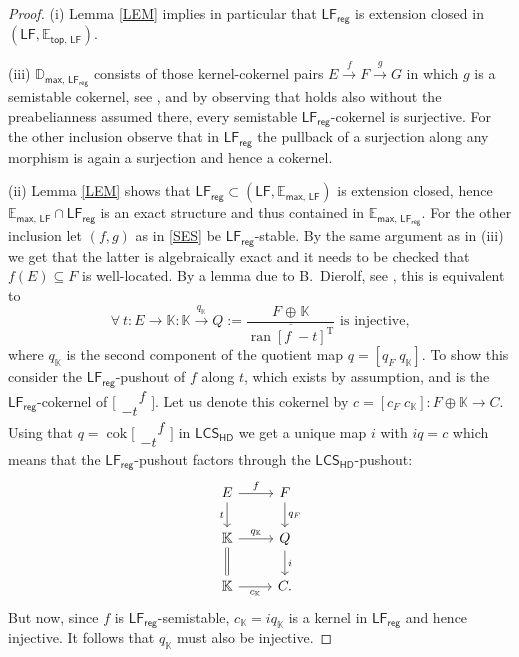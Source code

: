 \documentclass[11pt, a4paper, reqno]{amsart}
\theoremstyle{definition}
\newcommand{\ran}{\operatorname{ran}\nolimits}
\newcommand{\cok}{\operatorname{cok}\nolimits}
\newcommand{\KK}{\mathbb{K}}
\newcommand{\EE}{\mathbb{E}}
\newcommand{\DD}{\mathbb{D}}
\newcommand{\HDLCS}{\mathsf{LCS}_{\mathsf{HD}}}
\newcommand{\LF}{\mathsf{LF}}
\newcommand{\LFr}{\mathsf{LF}_{\mathsf{reg}}}
\begin{document}
\begin{proof}(i) Lemma \ref{LEM} implies in particular that $\LFr$ is extension closed in $(\LF,\EE_{\mathsf{top},\,\LF})$.

\smallskip

(iii) $\DD_{\mathsf{max},\,\LFr}$ consists of those kernel-cokernel pairs $E\stackrel{f}{\rightarrow}F\stackrel{g}{\rightarrow}G$ in which $g$ is a semistable cokernel, see \cite[Prop 9.2]{HR24}, and by observing that  \cite[Prop 2.2.3]{SiegThesis} holds also without the preabelianness assumed there, every semistable $\LFr$-cokernel is surjective. For the other inclusion observe that in $\LFr$ the pullback of a surjection along any morphism is again a surjection and hence a cokernel.

\smallskip

(ii) Lemma \ref{LEM} shows that $\LFr\subset(\LF,\EE_{\mathsf{max},\,\LF})$ is extension closed, hence $\EE_{\mathsf{max},\,\LF}\cap\LFr$ is an exact structure and thus contained in $\EE_{\mathsf{max},\,\LFr}$. For the other inclusion let $(f,g)$ as in \eqref{SES} be $\LFr$-stable. By the same argument as in (iii) we get that the latter is algebraically exact and it needs to be checked that $f(E)\subseteq F$ is well-located. By a lemma due to B.~Dierolf, see \cite[Lem 4.10]{W25}, this is equivalent to
$$
\forall\:t\colon E\rightarrow\KK\colon \KK\stackrel{q_{\KK}}{\longrightarrow}Q:=\textstyle\frac{F\hspace{1pt}\oplus\hspace{1pt}\KK}{\overline{\ran[f\;-t]^{\operatorname{T}}}}\text{ is injective,}
$$
where $q_{\KK}$ is the second component of the quotient map $q=[q_F\;q_{\KK}]$. To show this consider the $\LFr$-pushout of $f$ along $t$, which exists by assumption, and is the $\LFr$-cokernel of $\bigl[\begin{smallmatrix}\phantom{-}f\\-t\end{smallmatrix}\bigr]$. Let us denote this cokernel by $c=[c_F\;c_{\KK}]\colon F\oplus\KK\rightarrow C$. Using that $q=\cok\bigl[\begin{smallmatrix}\phantom{-}f\\-t\end{smallmatrix}\bigr]$ in $\HDLCS$ we get a unique map $i$ with $iq=c$ which means that the $\LFr$-pushout factors through the $\HDLCS$-pushout:
\begin{equation*}
\begin{tikzcd}
E\ar[r,"f"]\ar[d,swap,"t"]&F\ar[d,"q_F"]\\
\KK\ar[d,equals]\ar[r,"q_{\KK}"] & Q\ar[d,"i"] \\
\KK\ar[r,swap,"c_{\KK}"] & C. 
\end{tikzcd}
\end{equation*}
But now, since $f$ is $\LFr$-semistable, $c_{\KK}=iq_{\KK}$ is a kernel in $\LFr$ and hence injective. It follows that $q_{\KK}$ must also be injective.


\end{proof}
\end{document}
